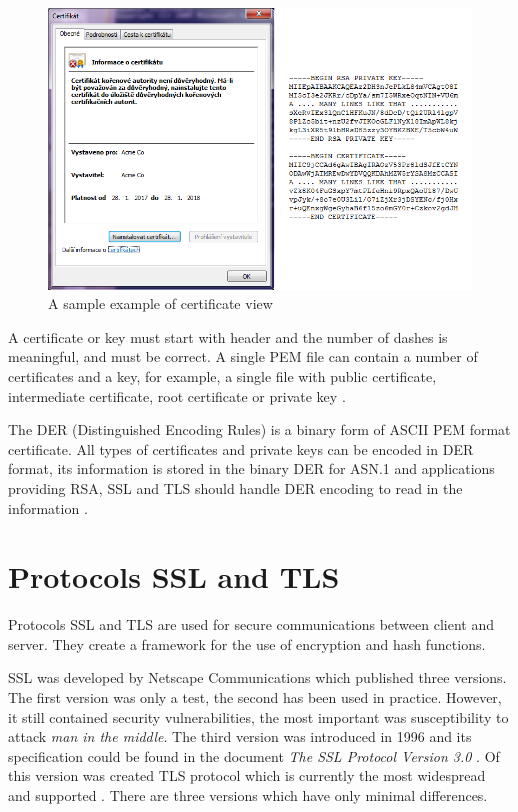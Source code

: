 \documentclass[
  digital, %
  notable,   %
  lof,     %
  lot,     %
]{fithesis3}
\begin{document}
\begin{figure}[th]
	\centering
	\includegraphics[width=1\textwidth]{pem-der}
	\caption{A sample example of certificate view}
	\label{fig:vzorPEM-DER}
\end{figure}

A certificate or key must start with header and the number of dashes is meaningful, and must 
be correct. A single PEM file can contain a number of certificates and a key, for example, a 
single file with public certificate, intermediate certificate, root certificate or private key 
\cite{howToSsl}.

The DER (Distinguished Encoding Rules) is a binary form of ASCII PEM format 
certificate. All types of certificates and private keys can be encoded in DER format, its 
information is stored in the binary DER for ASN.1 and applications providing RSA, SSL and TLS 
should handle DER encoding to read in the information \cite{bakker_2014}.

\section{Protocols SSL and TLS}
Protocols SSL and TLS are used for secure communications between client and server. They 
create a framework for the use of encryption and hash functions.

SSL was developed by Netscape Communications which published three versions. The first version 
was only a test, the second has been used in practice. However, it still contained security 
vulnerabilities, the most important was susceptibility to attack \textit{man in the middle}. %
The third version was introduced in 1996 and its specification could be found in the document 
\textit{The SSL Protocol Version 3.0} \cite{freier2011secure}. Of this version was created TLS 
protocol which is currently the most widespread and supported \cite{oppliger2003security}. 
There are three versions which have only minimal differences.
\end{document}
